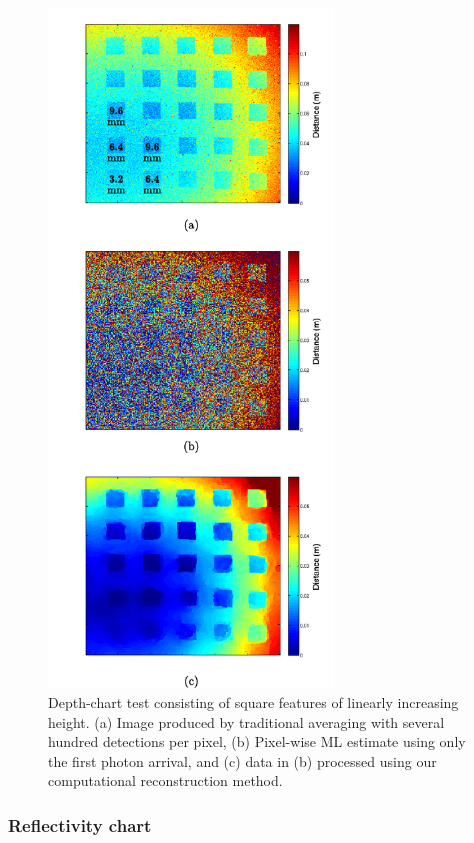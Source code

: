 \begin{figure}[h!]
\centering
\includegraphics[height=18cm]{figure-first-depthchart.pdf}
\caption{Depth-chart test consisting of square features of linearly increasing height. (a) Image produced by traditional averaging with several hundred detections per pixel, (b) Pixel-wise ML estimate using only the first photon arrival, and (c) data in (b) processed using our computational reconstruction method.}
\label{figure:first-depthchart}
\end{figure}

\subsubsection{Reflectivity chart}

